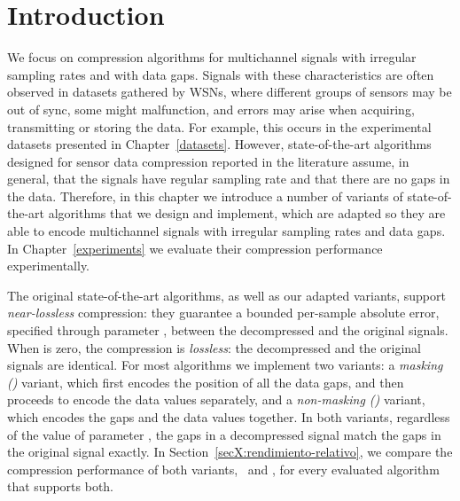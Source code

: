

\section{Introduction}
\label{algo:overview}

\vspace{-10pt}
We focus on compression algorithms for multichannel signals with irregular sampling rates and with data gaps. Signals with these characteristics are often observed in datasets gathered by WSNs, where different groups of sensors may be out of sync, some might malfunction, and errors may arise when acquiring, transmitting or storing the data. For example, this occurs in the experimental datasets presented in Chapter~\ref{datasets}. However, state-of-the-art algorithms designed for sensor data compression reported in the literature \cite{AnEva2013, Signal2016} assume, in general, that the signals have regular sampling rate and that there are no gaps in the data. Therefore, in this chapter we introduce a number of variants of state-of-the-art algorithms that we design and implement, which are adapted so they are able to encode multichannel signals with irregular sampling rates and data gaps. In Chapter~\ref{experiments} we evaluate their compression performance experimentally.


The original state-of-the-art algorithms, as well as our adapted variants, support \textit{near-lossless} compression: they guarantee a bounded per-sample absolute error,  specified through parameter \maxerror, between the decompressed and the original signals. When \maxerror is zero, the compression is \textit{lossless}: the decompressed and the original signals are identical. For most algorithms we implement two variants: a \textit{masking (\maskalgo)} variant, which first encodes the position of all the data gaps, and then proceeds to encode the data values separately, and a \textit{non-masking (\NOmaskalgo)} variant, which encodes the gaps and the data values together. In both variants, regardless of the value of parameter \maxerror, the gaps in a decompressed signal match the gaps in the original signal exactly. In Section~\ref{secX:rendimiento-relativo}, we compare the compression performance of both variants, \maskalgo\ and \NOmaskalgo, for every evaluated algorithm that supports both.


